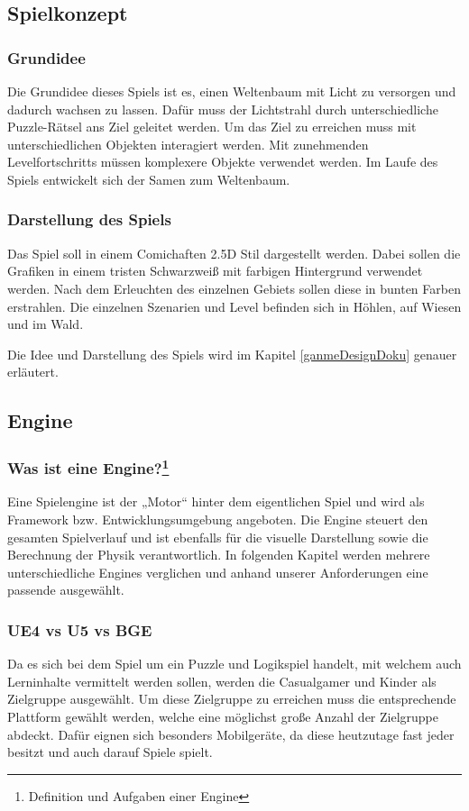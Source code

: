 \subsection{Spielkonzept}
\subsubsection{Grundidee}
Die Grundidee dieses Spiels ist es, einen Weltenbaum mit Licht zu versorgen und dadurch wachsen zu lassen. Dafür muss der Lichtstrahl durch unterschiedliche Puzzle-Rätsel ans Ziel geleitet werden. Um das Ziel zu erreichen muss mit unterschiedlichen Objekten interagiert werden. Mit zunehmenden Levelfortschritts müssen komplexere Objekte verwendet werden. Im Laufe des Spiels entwickelt sich der Samen zum Weltenbaum.

\subsubsection{Darstellung des Spiels}
Das Spiel soll in einem Comichaften 2.5D Stil dargestellt werden. Dabei sollen die Grafiken in einem tristen Schwarzweiß mit farbigen Hintergrund verwendet werden. Nach dem Erleuchten des einzelnen Gebiets sollen diese in bunten Farben erstrahlen. Die einzelnen Szenarien und Level befinden sich in Höhlen, auf Wiesen und im Wald.



Die Idee und Darstellung des Spiels wird im Kapitel \ref{ganmeDesignDoku} genauer erläutert.

\subsection{Engine}
\subsubsection[Was ist eine Engine?]{Was ist eine Engine?\footnote{Definition und Aufgaben einer Engine\cite{zhenpeng2010}}}
Eine Spielengine ist der „Motor“ hinter dem eigentlichen Spiel und wird als Framework bzw. Entwicklungsumgebung angeboten. Die Engine steuert den gesamten Spielverlauf und ist ebenfalls für die visuelle Darstellung sowie die Berechnung der Physik verantwortlich. In folgenden Kapitel werden mehrere unterschiedliche Engines verglichen und anhand unserer Anforderungen eine passende ausgewählt. 

\subsubsection{\ac{UE4} vs \ac{U5} vs \ac{BGE}}
Da es sich bei dem Spiel um ein Puzzle und Logikspiel handelt, mit welchem auch Lerninhalte vermittelt werden sollen, werden die Casualgamer und Kinder als Zielgruppe ausgewählt. Um diese Zielgruppe zu erreichen muss die entsprechende Plattform gewählt werden, welche eine möglichst große Anzahl der Zielgruppe abdeckt. Dafür eignen sich besonders Mobilgeräte, da diese heutzutage fast jeder besitzt und auch darauf Spiele spielt.  \\

